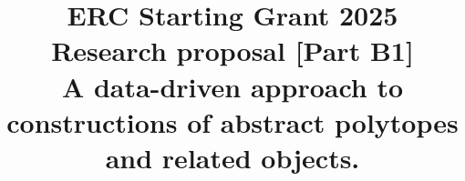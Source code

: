 \documentclass[a4paper,12pt,english]{article}
\begin{document}
\title{ \textbf{\normalsize {ERC Starting Grant 2025} \\ \normalsize Research proposal [Part B1] \\  \large A data-driven approach to constructions of abstract polytopes and related objects.\\ \large \acr }}

\author{%
}
\date{}

\maketitle
\thispagestyle{fancy}


 
\clearpage

\printbibliography

\clearpage







 
\end{document}
